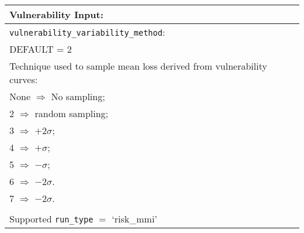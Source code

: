  
\vspace{2em}
\begin{tabular}{|p{\textwidth}|}
\hline
\vspace{0.3em} \noindent \Large \textbf{Vulnerability Input:} \normalsize \\
\hline \vspace{0.1em} \texttt{vulnerability\_variability\_method}: \\
DEFAULT = 2 \\
Technique used to sample mean loss derived from vulnerability curves: \\
 \hspace{0.5em} None $\Rightarrow$ No sampling; \\
 \hspace{0.5em} 2 $\Rightarrow$ random sampling; \\
 \hspace{0.5em} 3 $\Rightarrow$ $+2\sigma$; \\
 \hspace{0.5em} 4 $\Rightarrow$ $+\sigma$; \\
 \hspace{0.5em} 5 $\Rightarrow$ $-\sigma$; \\
 \hspace{0.5em} 6 $\Rightarrow$ $-2\sigma$.\\
 \hspace{0.5em} 7 $\Rightarrow$ $-2\sigma$.\\
 \\
 Supported \texttt{run\_type} $=$ `risk\_mmi' \\
  \hline
 \end{tabular}

